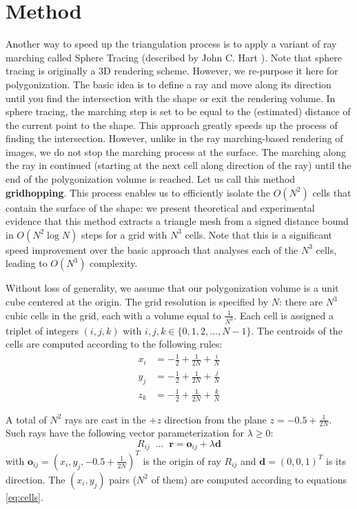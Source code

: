 \documentclass[11pt,twocolumn]{article}
\begin{document}
	\section{Method}\label{sec:ghop}
		Another way to speed up the triangulation process is to apply a variant of ray marching called Sphere Tracing (described by John C. Hart \cite{HartEtAl89rtfractals,Hart94spheretracing}).
		Note that sphere tracing is originally a 3D rendering scheme.
		However, we re-purpose it here for polygonization.
		The basic idea is to define a ray and move along its direction until you find the intersection with the shape or exit the rendering volume.
		In sphere tracing, the marching step is set to be equal to the (estimated) distance of the current point to the shape.
		This approach greatly speeds up the process of finding the intersection.
		However, unlike in the ray marching-based rendering of images, we do not stop the marching process at the surface.
		The marching along the ray in continued (starting at the next cell along direction of the ray) until the end of the polygonization volume is reached.
		Let us call this method \textbf{gridhopping}.
		This process enables us to efficiently isolate the $O(N^2)$ cells that contain the surface of the shape:
		we present theoretical and experimental evidence that this method extracts a triangle mesh from a signed distance bound in $O(N^2\log N)$ steps for a grid with $N^3$ cells.
		Note that this is a significant speed improvement over the basic approach that analyses each of the $N^3$ cells, leading to $O(N^3)$ complexity.

		Without loss of generality, we assume that our polygonization volume is a unit cube centered at the origin.
		The grid resolution is specified by $N$: there are $N^3$ cubic cells in the grid, each with a volume equal to $\frac{1}{N^3}$.
		Each cell is assigned a triplet of integers $(i, j, k)$ with $i, j, k\in \{0, 1, 2, \ldots, N-1\}$.
		The centroids of the cells are computed according to the following rules:
		\begin{align}\label{eq:cells}
			x_i &= -\frac{1}{2} + \frac{1}{2N} + \frac{i}{N}\nonumber\\
			y_j &= -\frac{1}{2} + \frac{1}{2N} + \frac{j}{N}\\
			z_k &= -\frac{1}{2} + \frac{1}{2N} + \frac{k}{N}\nonumber
		\end{align}

		A total of $N^2$ rays are cast in the $+z$ direction from the plane $z=-0.5+\frac{1}{2N}$.
		Such rays have the following vector parameterization for $\lambda \geq 0$:
		\begin{equation}
			R_{ij}\;\;\ldots\;\;\mathbf{r}=
			\mathbf{o}_{ij} + \lambda\mathbf{d}
		\end{equation}
		with $\mathbf{o}_{ij}=(x_i, y_j, -0.5+\frac{1}{2N})^T$ is the origin of ray $R_{ij}$ and $\mathbf{d}=(0, 0, 1)^T$ is its direction.
		The $(x_i, y_j)$ pairs ($N^2$ of them) are computed according to equations \eqref{eq:cells}.
\end{document}
